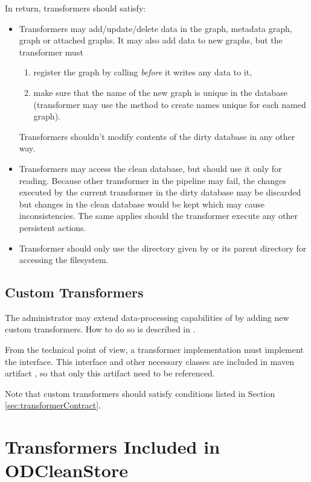 In return, transformers should satisfy:

\begin{itemize}
  \item Transformers may add/update/delete data in the  graph, metadata graph,  graph or attached graphs. It may also add data to new graphs, but the transformer must
		\begin{enumerate}
			\item register the graph by calling  \textit{before} it writes any data to it,
			\item make sure that the name of the new graph is unique in the database (transformer may use the  method to create names unique for each named graph).
		\end{enumerate}
		Transformers shouldn't modify contents of the dirty database in any other way.
	\item Transformers may access the clean database, but should use it only for reading. Because other transformer in the pipeline may fail, the changes executed by the current transformer in the dirty database may be discarded but changes in the clean database would be kept which may cause inconsistencies. The same applies should the transformer execute any other persistent actions.
	\item Transformer should only use the directory given by  or its parent directory for accessing the filesystem.
\end{itemize}

\section{Custom Transformers}
\label{sec:customTransformers}
The administrator may extend data-processing capabilities of \odcs by adding new custom transformers. How to do so is described in .

From the technical point of view, a transformer implementation must implement the  interface. This interface and other necessary classes are included in maven artifact , so that only this artifact need to be referenced.

Note that custom transformers should satisfy conditions listed in Section \ref{sec:transformerContract}.

\chapter{Transformers Included in ODCleanStore}

